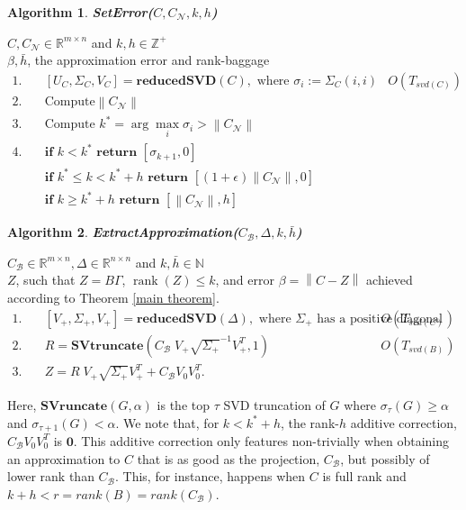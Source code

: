 \documentclass[11pt]{article}
\newcommand{\rank}{\operatorname{rank}}
\newtheorem{alg}{Algorithm}
\def\reals{\mathbb{R}}
\newcommand{\norm}[1]{\left\|#1\right\|}
\newcommand{\B}{\mathcal{B}}
\newcommand{\N}{\mathcal{N}}
\newcommand{\G}{\Gamma}
\newcommand{\0}{\ensuremath{\mathbf{0}}}
\renewcommand{\>}{\succ}
\newcommand{\<}{\prec}
\begin{document}
\begin{framed}
\begin{alg}\label{alg:seterr}
{\bf SetError($C, C_{\N}, k, h$) }
\end{alg}
 $C, C_{\N} \in \reals^{m \times n}$ and $k, h \in \mathbb{Z^+}$\\
 $\beta, \bar h$, the approximation error and rank-baggage
%
\begin{align*}
1. \quad& [U_C, \Sigma_C, V_C] = \textbf{reducedSVD}(C), \text{ where } \sigma_i := \Sigma_C (i, i)  & O\left( T_{svd(C)} \right) \\
2. \quad& \text{Compute} \norm{C_{\N}}\\
3. \quad& \text{Compute } k^* = \arg \max_i \sigma_i > \norm{C_{\N}} \\
4. \quad& \textbf{if } k < k^* \textbf{ return } [\sigma_{k+1}, 0] \\
 \quad& \textbf{if } k^* \leq k < k^* + h \textbf{ return } [(1 + \epsilon) \norm{C_{\N}}, 0] \\
\quad& \textbf{if } k \geq k^* + h \textbf{ return } [\norm{C_{\N}}, h] 
\end{align*}
%
\end{framed}


\begin{framed}
\begin{alg}\label{alg:extractApprox}
{\bf ExtractApproximation($C_{\B}, \Delta, k, \bar h$) }
\end{alg}
 $C_{\B} \in \reals^{m \times n}, \Delta \in \reals^{n \times n}$ and $k, \bar h \in \mathbb{N}$\\
 $Z$, such that $Z=B \G$, $\rank(Z) \leq k$, and error $\beta = \norm{C - Z}$ achieved according to Theorem \ref{main theorem}.
%
\begin{align*}
1. \quad& [V_+, \Sigma_+, V_+] = \textbf{reducedSVD} (\Delta),\text{ where } \Sigma_+ \text{ has a positive diagonal } & O\left(T_{svd(C)} \right)\\
2. \quad& R = \textbf{SVtruncate}\left( C_{\B} \; V_+ \sqrt{\Sigma_+}^{-1} V_+ ^T, 1 \right)  & O\left( T_{svd(B)} \right)\\
3. \quad& Z = R \; V_+ \sqrt{\Sigma_+} V_+ ^T  + C_{\B} V_0 V_0 ^T.
\end{align*}
%
\end{framed}
\noindent Here, $\textbf{SVruncate}(G, \alpha)$ is the top $\tau$ SVD truncation of $G$ where $\sigma_{\tau} (G) \geq \alpha$ and $\sigma_{\tau + 1} (G) < \alpha$.
We note that, for $k < k^* + h$, the rank-$h$ additive correction, $C_{\B} V_0 V_0 ^T$ is $\mathbf{0}$. This additive correction only features non-trivially when obtaining an approximation to $C$ that is as good as the projection, $C_{\B}$, but possibly of lower rank than $C_{\B}$. This, for instance, happens when $C$ is full rank and $k + h < r = rank(B) = rank(C_{\B})$. 
\end{document}
